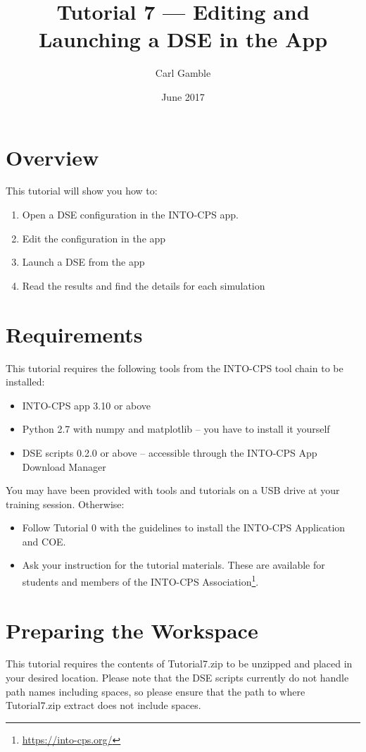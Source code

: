 \documentclass[11pt,a4paper]{../tutorial}
\title{Tutorial 7 --- Editing and Launching a DSE in the App}
\date{June 2017}
\author{Carl Gamble}
\begin{document}
\section*{Overview}

This tutorial will show you how to:

\begin{enumerate}[noitemsep]
\item Open a DSE configuration in the INTO-CPS app.
\item Edit the configuration in the app
\item Launch a DSE from the app
\item Read the results and find the details for each simulation
\end{enumerate}

\section*{Requirements}

This tutorial requires the following tools from the INTO-CPS tool chain to be installed:

\begin{itemize}[noitemsep]
\item INTO-CPS app 3.10 or above
\item Python 2.7 with numpy and matplotlib -- you have to install it yourself
\item DSE scripts 0.2.0 or above -- accessible through the INTO-CPS App Download Manager
\end{itemize}

You may have been provided with tools and tutorials on a USB drive at your training session. Otherwise: 
\begin{itemize}[noitemsep]
\item Follow Tutorial 0 with the guidelines to install the INTO-CPS Application and COE.
\item Ask your instruction for the tutorial materials. These are available for students and members of the INTO-CPS Association\footnote{\url{https://into-cps.org/}}.
\end{itemize}


\section{Preparing the Workspace}
This tutorial requires the contents of Tutorial7.zip to be unzipped and placed in your desired location.  Please note that the DSE scripts currently do not handle path names including spaces, so please ensure that the path to where Tutorial7.zip extract does not include spaces.
\end{document}

